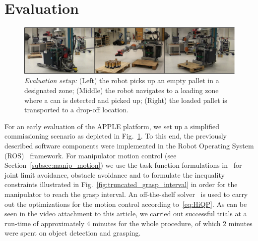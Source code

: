 \section{Evaluation}
\label{sec:eval}
% 
\begin{figure}[t!]
  \begin{center}
    \includegraphics[width =1\linewidth]{figs/evaluation}
    \caption{\textit{Evaluation setup:} (Left) the robot picks up an empty pallet in a designated
      zone; (Middle) the robot navigates to a loading zone where a can is detected and picked up;
      (Right) the loaded pallet is transported to a drop-off location.}
    \label{fig:evaluation}
    \vspace{-0.5cm}
  \end{center}
\end{figure}
% 
For an early evaluation of the APPLE platform, we set up a simplified commissioning scenario as
depicted in Fig.~\ref{fig:evaluation}. To this end, the previously described software components
were implemented in the Robot Operating System (ROS)~\cite{Quig09} framework. For manipulator motion
control (see \mbox{Section~\ref{subsec:manip_motion}}) we use the task function formulations
in~\cite{Kano09} for joint limit avoidance, obstacle avoidance and to formulate the inequality
constraints illustrated in Fig.~\ref{fig:truncated_grasp_interval} in order for the manipulator to
reach the grasp interval. An off-the-shelf solver~\cite{Guro15} is used to carry out the
optimizations for the motion control according to~\eqref{eq:HiQP}. As can be seen in the video
attachment to this article, we carried out successful trials at a run-time of approximately 4
minutes for the whole procedure, of which 2 minutes were spent on object detection and grasping.



